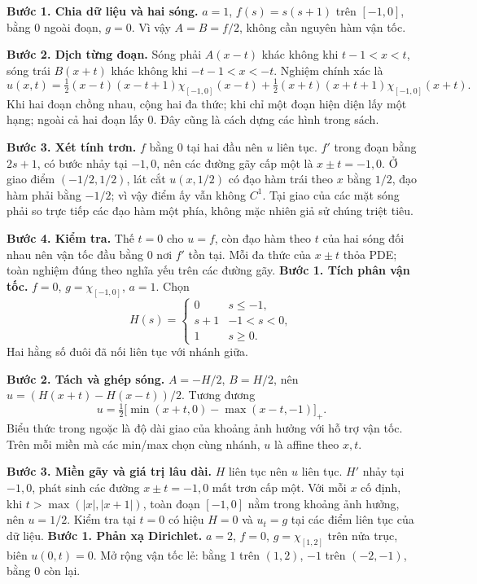 \textbf{Bước 1. Chia dữ liệu và hai sóng.} $a=1$, $f(s)=s(s+1)$ trên $[-1,0]$, bằng $0$ ngoài đoạn, $g=0$. Vì vậy $A=B=f/2$, không cần nguyên hàm vận tốc.

\textbf{Bước 2. Dịch từng đoạn.} Sóng phải $A(x-t)$ khác không khi $t-1<x<t$, sóng trái $B(x+t)$ khác không khi $-t-1<x<-t$. Nghiệm chính xác là
\[u(x,t)=\tfrac12(x-t)(x-t+1)\chi_{[-1,0]}(x-t)+\tfrac12(x+t)(x+t+1)\chi_{[-1,0]}(x+t).\]
Khi hai đoạn chồng nhau, cộng hai đa thức; khi chỉ một đoạn hiện diện lấy một hạng; ngoài cả hai đoạn lấy $0$. Đây cũng là cách dựng các hình trong sách.

\textbf{Bước 3. Xét tính trơn.} $f$ bằng $0$ tại hai đầu nên $u$ liên tục. $f'$ trong đoạn bằng $2s+1$, có bước nhảy tại $-1,0$, nên các đường gãy cấp một là $x\pm t=-1,0$. Ở giao điểm $(-1/2,1/2)$, lát cắt $u(x,1/2)$ có đạo hàm trái theo $x$ bằng $1/2$, đạo hàm phải bằng $-1/2$; vì vậy điểm ấy vẫn không $C^1$. Tại giao của các mặt sóng phải so trực tiếp các đạo hàm một phía, không mặc nhiên giả sử chúng triệt tiêu.

\textbf{Bước 4. Kiểm tra.} Thế $t=0$ cho $u=f$, còn đạo hàm theo $t$ của hai sóng đối nhau nên vận tốc đầu bằng $0$ nơi $f'$ tồn tại. Mỗi đa thức của $x\pm t$ thỏa PDE; toàn nghiệm đúng theo nghĩa yếu trên các đường gãy.
\textbf{Bước 1. Tích phân vận tốc.} $f=0$, $g=\chi_{[-1,0]}$, $a=1$. Chọn
\[H(s)=\begin{cases}0&s\le-1,\\s+1&-1<s<0,\\1&s\ge0.\end{cases}\]
Hai hằng số đuôi đã nối liên tục với nhánh giữa.

\textbf{Bước 2. Tách và ghép sóng.} $A=-H/2$, $B=H/2$, nên $u=(H(x+t)-H(x-t))/2$. Tương đương
\[u=\tfrac12\big[\min(x+t,0)-\max(x-t,-1)\big]_+.\]
Biểu thức trong ngoặc là độ dài giao của khoảng ảnh hưởng với hỗ trợ vận tốc. Trên mỗi miền mà các min/max chọn cùng nhánh, $u$ là affine theo $x,t$.

\textbf{Bước 3. Miền gãy và giá trị lâu dài.} $H$ liên tục nên $u$ liên tục. $H'$ nhảy tại $-1,0$, phát sinh các đường $x\pm t=-1,0$ mất trơn cấp một. Với mỗi $x$ cố định, khi $t>\max(|x|,|x+1|)$, toàn đoạn $[-1,0]$ nằm trong khoảng ảnh hưởng, nên $u=1/2$. Kiểm tra tại $t=0$ có hiệu $H=0$ và $u_t=g$ tại các điểm liên tục của dữ liệu.
\textbf{Bước 1. Phản xạ Dirichlet.} $a=2$, $f=0$, $g=\chi_{[1,2]}$ trên nửa trục, biên $u(0,t)=0$. Mở rộng vận tốc lẻ: bằng $1$ trên $(1,2)$, $-1$ trên $(-2,-1)$, bằng $0$ còn lại.

